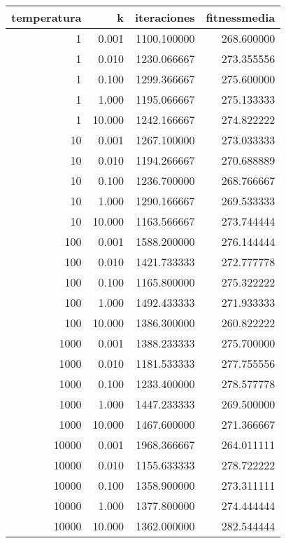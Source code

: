 \begin{tabular}{rrrr}
\toprule
 temperatura &       k &  iteraciones &  fitnessmedia \\
\midrule
           1 &   0.001 &  1100.100000 &    268.600000 \\
           1 &   0.010 &  1230.066667 &    273.355556 \\
           1 &   0.100 &  1299.366667 &    275.600000 \\
           1 &   1.000 &  1195.066667 &    275.133333 \\
           1 &  10.000 &  1242.166667 &    274.822222 \\
          10 &   0.001 &  1267.100000 &    273.033333 \\
          10 &   0.010 &  1194.266667 &    270.688889 \\
          10 &   0.100 &  1236.700000 &    268.766667 \\
          10 &   1.000 &  1290.166667 &    269.533333 \\
          10 &  10.000 &  1163.566667 &    273.744444 \\
         100 &   0.001 &  1588.200000 &    276.144444 \\
         100 &   0.010 &  1421.733333 &    272.777778 \\
         100 &   0.100 &  1165.800000 &    275.322222 \\
         100 &   1.000 &  1492.433333 &    271.933333 \\
         100 &  10.000 &  1386.300000 &    260.822222 \\
        1000 &   0.001 &  1388.233333 &    275.700000 \\
        1000 &   0.010 &  1181.533333 &    277.755556 \\
        1000 &   0.100 &  1233.400000 &    278.577778 \\
        1000 &   1.000 &  1447.233333 &    269.500000 \\
        1000 &  10.000 &  1467.600000 &    271.366667 \\
       10000 &   0.001 &  1968.366667 &    264.011111 \\
       10000 &   0.010 &  1155.633333 &    278.722222 \\
       10000 &   0.100 &  1358.900000 &    273.311111 \\
       10000 &   1.000 &  1377.800000 &    274.444444 \\
       10000 &  10.000 &  1362.000000 &    282.544444 \\
\bottomrule
\end{tabular}
